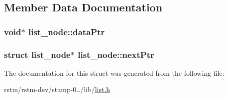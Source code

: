 \subsection{Member Data Documentation}
\hypertarget{structlist__node_a0a922cb31b0056d0768705b4e3520b9b}{
\subsubsection[{data\-Ptr}]{\setlength{\rightskip}{0pt plus 5cm}void$\ast$ list\-\_\-node\-::data\-Ptr}}\label{structlist__node_a0a922cb31b0056d0768705b4e3520b9b}
\hypertarget{structlist__node_a313d757129d4df20359f56a05b94175a}{
\subsubsection[{next\-Ptr}]{\setlength{\rightskip}{0pt plus 5cm}struct {\bf list\-\_\-node}$\ast$ list\-\_\-node\-::next\-Ptr}}\label{structlist__node_a313d757129d4df20359f56a05b94175a}


The documentation for this struct was generated from the following file\-:\begin{DoxyCompactItemize}
\item 
rstm/rstm-\/dev/stamp-\/0../lib/\hyperlink{list_8h}{list.\-h}\end{DoxyCompactItemize}
